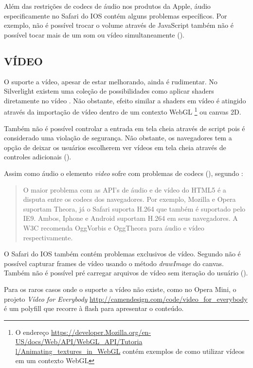 Além das restrições de codecs de áudio nos produtos da Apple,
áudio especificamente no Safari do IOS contém alguns problemas específicos.
Por exemplo, não é possível trocar o volume através de
JavaScript também não é possível tocar mais de um som ou vídeo
simultaneamente \autocite{unsolvedMediaHtmlIssues} ().

\subsection{VÍDEO}

O suporte a vídeo, apesar de estar melhorando, ainda é rudimentar.
No Silverlight existem uma coleção de possibilidades como aplicar
shaders diretamente no vídeo \autocite[p. 8]{researchOnHtml}
. Não obstante, efeito similar 
a shaders em vídeo é atingido através da importação de
vídeo dentro de um contexto WebGL \footnote{O endereço
\url{https://developer.Mozilla.org/en-US/docs/Web/API/WebGL_API/Tutoria
l/Animating_textures_in_WebGL} contém exemplos de como utilizar vídeos
em um contexto WebGL} ou canvas 2D.

Também não é possível controlar a entrada em tela cheia através de
script pois é considerado uma violação de segurança. Não obstante,
os navegadores tem a opção de deixar os usuários escolherem ver
vídeos em tela cheia através de controles adicionais \autocite[p.
68]{proHtml5} ().

Assim como áudio o elemento \textit{video} sofre com problemas de
codecs (), segundo \citet{html5Tradeoffs}:
\begin{quote}
O maior problema com as API's de áudio e de vídeo do HTML5 é
a disputa entre os codecs dos navegadores. Por exemplo, Mozilla e
Opera suportam Theora, já o Safari suporta H.264 que também é
suportado pelo IE9. Ambos, Iphone e Android suportam H.264 em seus
navegadores. A W3C recomenda OggVorbis e OggTheora para áudio e vídeo
respectivamente.
\end{quote}

O Safari do IOS também contém problemas exclusivos de vídeo. Segundo
\citet{unsolvedMediaHtmlIssues} não é possível capturar frames de
vídeo usando o método \textit{drawImage} do canvas. Também não é
possível pré carregar arquivos de vídeo sem iteração do usuário ().

Para os raros casos onde o suporte a vídeo não existe,
como no Opera Mini, o projeto \textit{Vídeo for Everybody}
\url{http://camendesign.com/code/video_for_everybody} é um polyfill que
recorre à flash para apresentar o conteúdo.

